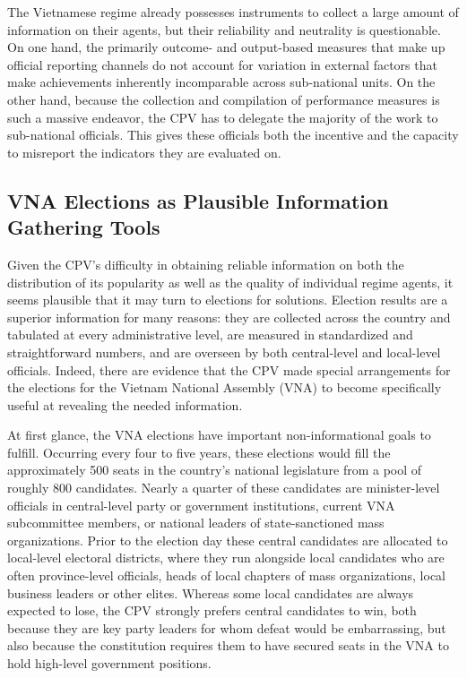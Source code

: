 \documentclass[12pt]{article}
\newcommand{\1}{\mathbbm{1}}
\begin{document}
The Vietnamese regime already possesses instruments to collect a large amount of information on their agents, but their reliability and neutrality is questionable. On one hand, the primarily outcome- and output-based measures that make up official reporting channels do not account for variation in external factors that make achievements inherently incomparable across sub-national units. On the other hand, because the collection and compilation of performance measures is such a massive endeavor, the CPV has to delegate the majority of the work to sub-national officials. This gives these officials both the incentive and the capacity to misreport the indicators they are evaluated on.

\subsection{VNA Elections as Plausible Information Gathering Tools}

Given the CPV's difficulty in obtaining reliable information on both the distribution of its popularity as well as the quality of individual regime agents, it seems plausible that it may turn to elections for solutions. Election results are a superior information for many reasons: they are collected across the country and tabulated at every administrative level, are measured in standardized and straightforward numbers, and are overseen by both central-level and local-level officials. Indeed, there are evidence that the CPV made special arrangements for the elections for the Vietnam National Assembly (VNA) to become specifically useful at revealing the needed information.

At first glance, the VNA elections have important non-informational goals to fulfill. Occurring every four to five years, these elections would fill the approximately 500 seats in the country's national legislature from a pool of roughly 800 candidates. Nearly a quarter of these candidates are minister-level officials in central-level party or government institutions, current VNA subcommittee members, or national leaders of state-sanctioned mass organizations. Prior to the election day these central candidates are allocated to local-level electoral districts, where they run alongside local candidates who are often province-level officials, heads of local chapters of mass organizations, local business leaders or other elites. Whereas some local candidates are always expected to lose, the CPV strongly prefers central candidates to win, both because they are key party leaders for whom defeat would be embarrassing, but also because the constitution requires them to have secured seats in the VNA to hold high-level government positions.
\end{document}

